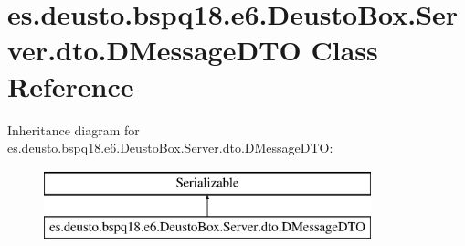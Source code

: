 \hypertarget{classes_1_1deusto_1_1bspq18_1_1e6_1_1_deusto_box_1_1_server_1_1dto_1_1_d_message_d_t_o}{}\section{es.\+deusto.\+bspq18.\+e6.\+Deusto\+Box.\+Server.\+dto.\+D\+Message\+D\+TO Class Reference}
\label{classes_1_1deusto_1_1bspq18_1_1e6_1_1_deusto_box_1_1_server_1_1dto_1_1_d_message_d_t_o}
Inheritance diagram for es.\+deusto.\+bspq18.\+e6.\+Deusto\+Box.\+Server.\+dto.\+D\+Message\+D\+TO\+:\begin{figure}[H]
\begin{center}
\leavevmode
\includegraphics[height=2.000000cm]{classes_1_1deusto_1_1bspq18_1_1e6_1_1_deusto_box_1_1_server_1_1dto_1_1_d_message_d_t_o}
\end{center}
\end{figure}
